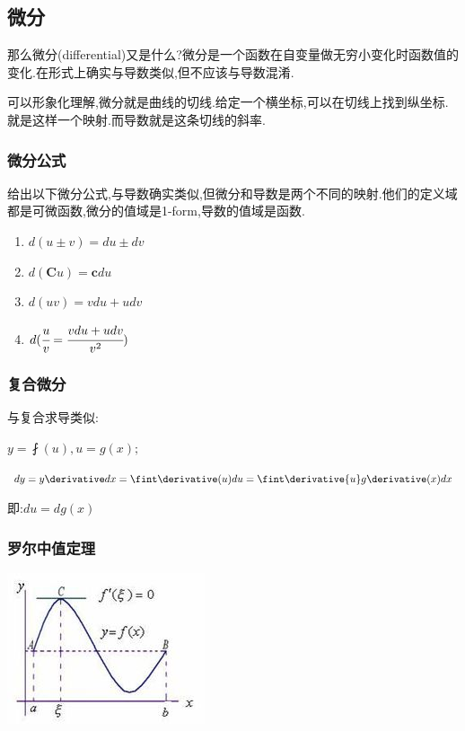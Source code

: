 {{}%

\subsection{微分}{
那么微分(differential)又是什么?微分是一个函数在自变量做无穷小变化时函数值的变化.在形式上确实与导数类似,但不应该与导数混淆.

可以形象化理解,微分就是曲线的切线.给定一个横坐标,可以在切线上找到纵坐标.就是这样一个映射.而导数就是这条切线的斜率.

\subsubsection{微分公式}{
  给出以下微分公式,与导数确实类似,但微分和导数是两个不同的映射.他们的定义域都是可微函数,微分的值域是1-form,导数的值域是函数.
  \begin{enumerate}
    \item $d(u \pm v) = du \pm dv$
    \item $d(\mathbf{C}u) = \mathbf{c}du$
    \item $d(uv) = vdu + udv$
    \item $d(\cfrac{u}{v} = \cfrac{vdu + udv}{v^2})$
  \end{enumerate}
}%

\subsubsection{复合微分}{
  与复合求导类似:

  $y = \fint(u), u = g(x);$

  $dy = y\derivative dx = \fint\derivative(u)du = \fint\derivative{u}g\derivative(x)dx$

  即:$du = dg(x)$
}%

\subsubsection{罗尔中值定理}{
  \begin{center}
    \includegraphics{resources/Rolle's_mean_value_theorem.jpg}
  \end{center}

}}}

